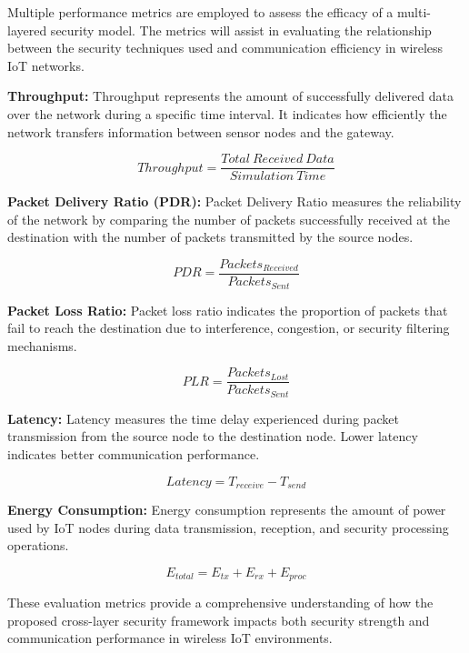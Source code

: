 \documentclass[a4paper,fleqn]{cas-dc}
\numberwithin{equation}{section}
\begin{document}
Multiple performance metrics are employed to assess the efficacy of a multi-layered security model. The metrics will assist in evaluating the relationship between the security techniques used and communication efficiency in wireless IoT networks.

\textbf{Throughput:} Throughput represents the amount of successfully delivered data over the network during a specific time interval. It indicates how efficiently the network transfers information between sensor nodes and the gateway.

\begin{equation}
Throughput = \frac{Total\ Received\ Data}{Simulation\ Time}
\label{eq:throughput}
\end{equation}

\textbf{Packet Delivery Ratio (PDR):} Packet Delivery Ratio measures the reliability of the network by comparing the number of packets successfully received at the destination with the number of packets transmitted by the source nodes.

\begin{equation}
PDR = \frac{Packets_{Received}}{Packets_{Sent}}
\label{eq:pdr}
\end{equation}

\textbf{Packet Loss Ratio:} Packet loss ratio indicates the proportion of packets that fail to reach the destination due to interference, congestion, or security filtering mechanisms.

\begin{equation}
PLR = \frac{Packets_{Lost}}{Packets_{Sent}}
\label{eq:plr}
\end{equation}

\textbf{Latency:} Latency measures the time delay experienced during packet transmission from the source node to the destination node. Lower latency indicates better communication performance.

\begin{equation}
Latency = T_{receive} - T_{send}
\label{eq:latency}
\end{equation}

\textbf{Energy Consumption:} Energy consumption represents the amount of power used by IoT nodes during data transmission, reception, and security processing operations.

\begin{equation}
E_{total} = E_{tx} + E_{rx} + E_{proc}
\end{equation}

These evaluation metrics provide a comprehensive understanding of how the proposed cross-layer security framework impacts both security strength and communication performance in wireless IoT environments.
\end{document}
